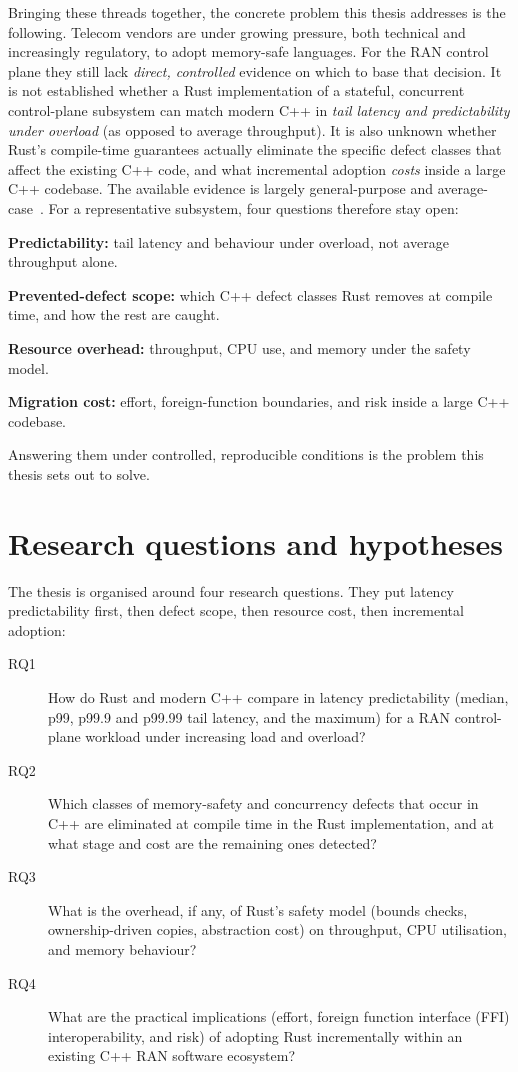 \documentclass[english,oneside,a4paper,censored,csm,software-track-2020]{HYthesisML}
\begin{document}
Bringing these threads together, the concrete problem this thesis addresses is the following.
Telecom vendors are under growing pressure, both technical and increasingly regulatory, to adopt
memory-safe languages. For the RAN control plane they still lack \emph{direct, controlled}
evidence on which to base that decision. It is not established whether a Rust implementation of
a stateful, concurrent control-plane subsystem can match modern C++ in \emph{tail latency and
predictability under overload} (as opposed to average throughput). It is also unknown whether
Rust's compile-time guarantees actually eliminate the specific defect classes that affect the
existing C++ code, and what incremental adoption \emph{costs} inside a large C++ codebase. The
available evidence is largely general-purpose and
average-case~\cite{balasubramanian2017rust,qin2020rust}. For a representative subsystem,
four questions therefore stay open:
\begin{compactitem}
\item \textbf{Predictability:} tail latency and behaviour under overload, not average
throughput alone.
\item \textbf{Prevented-defect scope:} which C++ defect classes Rust removes at compile time,
and how the rest are caught.
\item \textbf{Resource overhead:} throughput, CPU use, and memory under the safety model.
\item \textbf{Migration cost:} effort, foreign-function boundaries, and risk inside a large
C++ codebase.
\end{compactitem}
Answering them under controlled, reproducible conditions is the problem this thesis sets out
to solve.

\section{Research questions and hypotheses}\label{sec:rqs}
The thesis is organised around four research questions. They put latency predictability
first, then defect scope, then resource cost, then incremental adoption:

\begin{description}
  \item[RQ1] How do Rust and modern C++ compare in latency predictability (median, p99,
        p99.9 and p99.99 tail latency, and the maximum) for a RAN control-plane workload
        under increasing load and overload?
  \item[RQ2] Which classes of memory-safety and concurrency defects that occur in C++ are
        eliminated at compile time in the Rust implementation, and at what stage and cost
        are the remaining ones detected?
  \item[RQ3] What is the overhead, if any, of Rust's safety model (bounds checks,
        ownership-driven copies, abstraction cost) on throughput, CPU utilisation, and
        memory behaviour?
  \item[RQ4] What are the practical implications (effort, foreign function interface (FFI)
        interoperability, and risk) of adopting Rust incrementally within an existing C++ RAN
        software ecosystem?
\end{description}
\end{document}
